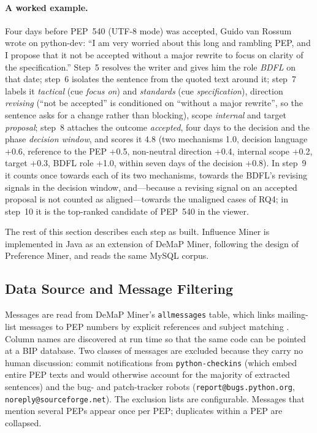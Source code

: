 \documentclass[sigconf,screen]{acmart}
\begin{document}
\paragraph{A worked example.} Four days before PEP~540 (UTF-8 mode) was accepted, Guido van Rossum wrote on python-dev: ``I am very worried about this long and rambling PEP, and I propose that it not be accepted without a major rewrite to focus on clarity of the specification.'' Step~5 resolves the writer and gives him the role \emph{BDFL} on that date; step~6 isolates the sentence from the quoted text around it; step~7 labels it \emph{tactical} (cue \emph{focus on}) and \emph{standards} (cue \emph{specification}), direction \emph{revising} (``not be accepted'' is conditioned on ``without a major rewrite'', so the sentence asks for a change rather than blocking), scope \emph{internal} and target \emph{proposal}; step~8 attaches the outcome \emph{accepted}, four days to the decision and the phase \emph{decision window}, and scores it 4.8 (two mechanisms 1.0, decision language +0.6, reference to the PEP +0.5, non-neutral direction +0.4, internal scope +0.2, target +0.3, BDFL role +1.0, within seven days of the decision +0.8). In step~9 it counts once towards each of its two mechanisms, towards the BDFL's revising signals in the decision window, and---because a revising signal on an accepted proposal is not counted as aligned---towards the unaligned cases of RQ4; in step~10 it is the top-ranked candidate of PEP~540 in the viewer.

The rest of this section describes each step as built. Influence Miner is implemented in Java as an extension of DeMaP Miner, following the design of Preference Miner, and reads the same MySQL corpus.

\subsection{Data Source and Message Filtering}
\label{sec:filtering}

Messages are read from DeMaP Miner's \texttt{allmessages} table, which links mailing-list messages to PEP numbers by explicit references and subject matching \cite{sharma2022demap}. Column names are discovered at run time so that the same code can be pointed at a BIP database. Two classes of messages are excluded because they carry no human discussion: commit notifications from \texttt{python-checkins} (which embed entire PEP texts and would otherwise account for the majority of extracted sentences) and the bug- and patch-tracker robots (\texttt{report@bugs.python.org}, \texttt{noreply@sourceforge.net}). The exclusion lists are configurable. Messages that mention several PEPs appear once per PEP; duplicates within a PEP are collapsed.
\end{document}
